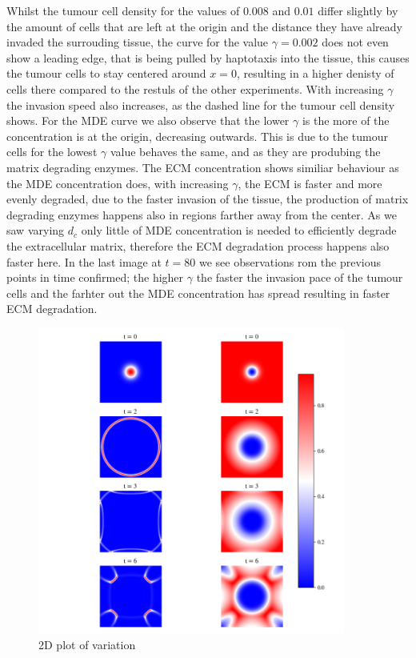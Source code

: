 Whilst the tumour cell density for the values of $0.008$ and $0.01$ differ slightly by the amount of cells that are left at the origin and the distance they have already invaded the surrouding tissue, the curve for the value $\gamma=0.002$ does not even show a leading edge, that is being pulled by haptotaxis into the tissue, this causes the tumour cells to stay centered around $x=0$, resulting in a higher denisty of cells there compared to the restuls of the other experiments. With increasing $\gamma$ the invasion speed also increases, as the dashed line for the tumour cell density shows. 
For the MDE curve we also observe that the lower $\gamma$ is the more of the concentration is at the origin, decreasing outwards. This is due to the tumour cells for the lowest $\gamma$ value behaves the same, and as they are produbing the matrix degrading enzymes. The ECM concentration shows similiar behaviour as the MDE concentration does, with increasing $\gamma$, the ECM is faster and more evenly degraded, due to the faster invasion of the tissue, the production of matrix degrading enzymes happens also in regions farther away from the center. As we saw varying $d_c$ only little of MDE concentration is needed to efficiently degrade the extracellular matrix, therefore the ECM degradation process happens also faster here.\newline
In the last image at $t=80$ we see observations rom the previous points in time confirmed; the higher $\gamma$ the faster the invasion pace of the tumour cells and the farhter out the MDE concentration has spread resulting in faster ECM degradation.\newline 
\begin{figure}[h]
    \centering
    \includegraphics[width=0.9\textwidth]{resources/images/gamma_2D_plot.png}
    \caption{2D plot of variation}
    \label{fig:gamma_2D_plot}
\end{figure}
